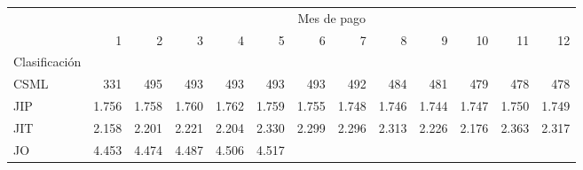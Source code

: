 \begin{tabular}{lllllllllllll}
\cline{1-13}
\multicolumn{1}{c}{} &
  \multicolumn{12}{|c}{Mes de pago} \\
\multicolumn{1}{c}{} &
  \multicolumn{1}{|r}{1} &
  \multicolumn{1}{r}{2} &
  \multicolumn{1}{r}{3} &
  \multicolumn{1}{r}{4} &
  \multicolumn{1}{r}{5} &
  \multicolumn{1}{r}{6} &
  \multicolumn{1}{r}{7} &
  \multicolumn{1}{r}{8} &
  \multicolumn{1}{r}{9} &
  \multicolumn{1}{r}{10} &
  \multicolumn{1}{r}{11} &
  \multicolumn{1}{r}{12} \\
\cline{1-13}
\multicolumn{1}{l}{Clasificación} &
  \multicolumn{1}{|r}{} &
  \multicolumn{1}{r}{} &
  \multicolumn{1}{r}{} &
  \multicolumn{1}{r}{} &
  \multicolumn{1}{r}{} &
  \multicolumn{1}{r}{} &
  \multicolumn{1}{r}{} &
  \multicolumn{1}{r}{} &
  \multicolumn{1}{r}{} &
  \multicolumn{1}{r}{} &
  \multicolumn{1}{r}{} &
  \multicolumn{1}{r}{} \\
\multicolumn{1}{l}{\hspace{1em}CSML} &
  \multicolumn{1}{|r}{331} &
  \multicolumn{1}{r}{495} &
  \multicolumn{1}{r}{493} &
  \multicolumn{1}{r}{493} &
  \multicolumn{1}{r}{493} &
  \multicolumn{1}{r}{493} &
  \multicolumn{1}{r}{492} &
  \multicolumn{1}{r}{484} &
  \multicolumn{1}{r}{481} &
  \multicolumn{1}{r}{479} &
  \multicolumn{1}{r}{478} &
  \multicolumn{1}{r}{478} \\
\multicolumn{1}{l}{\hspace{1em}JIP} &
  \multicolumn{1}{|r}{1.756} &
  \multicolumn{1}{r}{1.758} &
  \multicolumn{1}{r}{1.760} &
  \multicolumn{1}{r}{1.762} &
  \multicolumn{1}{r}{1.759} &
  \multicolumn{1}{r}{1.755} &
  \multicolumn{1}{r}{1.748} &
  \multicolumn{1}{r}{1.746} &
  \multicolumn{1}{r}{1.744} &
  \multicolumn{1}{r}{1.747} &
  \multicolumn{1}{r}{1.750} &
  \multicolumn{1}{r}{1.749} \\
\multicolumn{1}{l}{\hspace{1em}JIT} &
  \multicolumn{1}{|r}{2.158} &
  \multicolumn{1}{r}{2.201} &
  \multicolumn{1}{r}{2.221} &
  \multicolumn{1}{r}{2.204} &
  \multicolumn{1}{r}{2.330} &
  \multicolumn{1}{r}{2.299} &
  \multicolumn{1}{r}{2.296} &
  \multicolumn{1}{r}{2.313} &
  \multicolumn{1}{r}{2.226} &
  \multicolumn{1}{r}{2.176} &
  \multicolumn{1}{r}{2.363} &
  \multicolumn{1}{r}{2.317} \\
\multicolumn{1}{l}{\hspace{1em}JO} &
  \multicolumn{1}{|r}{4.453} &
  \multicolumn{1}{r}{4.474} &
  \multicolumn{1}{r}{4.487} &
  \multicolumn{1}{r}{4.506} &
  \multicolumn{1}{r}{4.517} &

\end{tabular}
